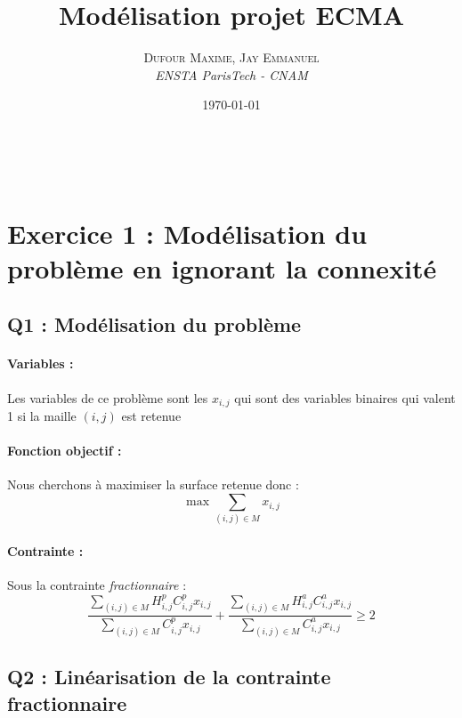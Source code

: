 \documentclass[a4paper, 11pt]{article} %
\title{\textbf{Modélisation projet ECMA}} %
\author{\textsc{Dufour Maxime, Jay Emmanuel} %
\\{\textit{ENSTA ParisTech - CNAM}}} %
\date{\today} %
\makeatletter
\renewcommand{\maketitle}{ %
\begin{flushright} %
{\LARGE\@title} %

\vspace{30pt} %

{\large\@author} %
\\\@date %

\vspace{20pt} %
\end{flushright}
}
\makeatother
\begin{document}
\vspace{200pt}

\maketitle %

\section{Exercice 1 : Modélisation du problème en ignorant la connexité}

\subsection{Q1 : Modélisation du problème}

\paragraph{Variables :}
Les variables de ce problème sont les $x_{i,j}$ qui sont des variables binaires qui valent 1 si la maille $(i,j)$ est retenue

\paragraph{Fonction objectif :}
Nous cherchons à maximiser la surface retenue donc :
$$
  \max \sum_{(i,j)\in M} x_{i,j}
$$

\paragraph{Contrainte :}
Sous la contrainte \textit{fractionnaire} :
\begin{equation}  
  \frac{\sum_{(i,j)\in M} H_{i,j}^p C_{i,j}^p x_{i,j}}{\sum_{(i,j)\in M} C_{i,j}^p x_{i,j}}
  + \frac{\sum_{(i,j)\in M} H_{i,j}^a C_{i,j}^a x_{i,j}}{\sum_{(i,j)\in M} C_{i,j}^a x_{i,j}} \geq 2
\label{c1}
\end{equation}  

\subsection{Q2 : Linéarisation de la contrainte fractionnaire}
\end{document}
